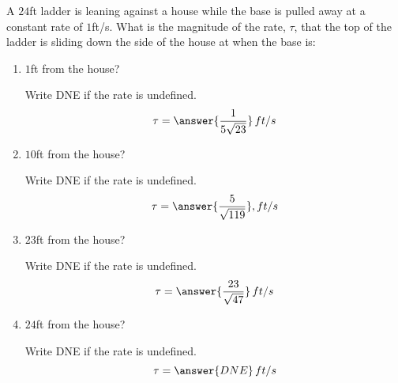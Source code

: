 \documentclass{ximera}
\author{Gregory Hartman \and Matthew Carr}
\begin{document}
\begin{exercise}



A $24$ft ladder is leaning against a house while the base is pulled
away at a constant rate of $1$ft/s.  What is the magnitude of the
rate, $\tau$, that the top of the ladder is sliding down the side of
the house at when the base is:

\begin{enumerate}
\item $1$ft from the house?\begin{prompt}Write DNE if the rate is undefined. \[\tau=\answer{\frac{1}{5\sqrt{23}}}\,ft/s\]\end{prompt}
\item $10$ft from the house?\begin{prompt}Write DNE if the rate is undefined. \[\tau=\answer{\frac{5}{\sqrt{119}}},ft/s\]\end{prompt}
\item $23$ft from the house?\begin{prompt}Write DNE if the rate is undefined. \[\tau=\answer{\frac{23}{\sqrt{47}}}\,ft/s\]\end{prompt}
\item $24$ft from the house?\begin{prompt}Write DNE if the rate is undefined. \[\tau=\answer{DNE}\,ft/s\]\end{prompt}
\end{enumerate}


\end{exercise}
\end{document}
